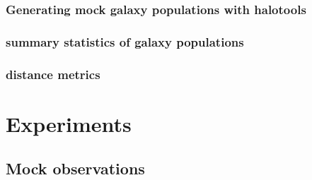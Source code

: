 \documentclass[12pt, preprint]{aastex}
\newcommand{\todo}[1]{{\bf \textcolor{red}{ #1}}}
\begin{document}
\subsubsection{Generating mock galaxy populations with halotools}




\subsubsection{summary statistics of galaxy populations}


\subsubsection{distance metrics}



\section{Experiments}\label{sec:data}
\subsection{Mock observations}
\end{document}
